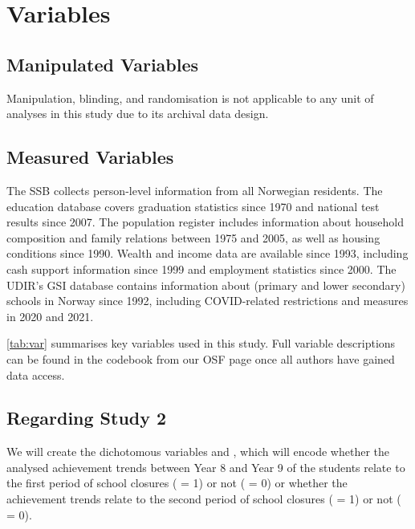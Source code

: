 \section{Variables}

\subsection{Manipulated Variables}
Manipulation, blinding, and randomisation is not applicable to any unit of analyses in this study due to its archival data design.

\subsection{Measured Variables}
The SSB collects person-level information from all Norwegian residents. The education database covers graduation statistics since 1970 and national test results since 2007. The population register includes information about household composition and family relations between 1975 and 2005, as well as housing conditions since 1990. Wealth and income data are available since 1993, including cash support information since 1999 and employment statistics since 2000. The UDIR's GSI database contains information about (primary and lower secondary) schools in Norway since 1992, including COVID-related restrictions and measures in 2020 and 2021.

\cref{tab:var} summarises key variables used in this study. Full variable descriptions can be found in the codebook from our OSF page once all authors have gained data access.

\subsection{Regarding Study 2}
We will create the dichotomous variables  and , which will encode whether the analysed achievement trends between Year 8 and Year 9 of the students relate to the first period of school closures ( = 1) or not ( = 0) or whether the achievement trends relate to the second period of school closures ( = 1) or not ( = 0).

